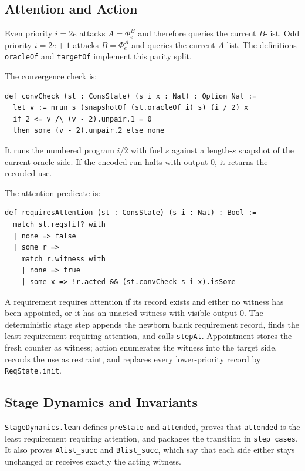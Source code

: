 \subsection{Attention and Action}

Even priority \(i=2e\) attacks \(A=\Phi_e^B\) and therefore queries the
current \(B\)-list.  Odd priority \(i=2e+1\) attacks \(B=\Phi_e^A\) and
queries the current \(A\)-list.  The definitions
\texttt{oracleOf} and \texttt{targetOf} implement this parity split.

The convergence check is:

\begin{lstlisting}
def convCheck (st : ConsState) (s i x : Nat) : Option Nat :=
  let v := nrun s (snapshotOf (st.oracleOf i) s) (i / 2) x
  if 2 <= v /\ (v - 2).unpair.1 = 0
  then some (v - 2).unpair.2 else none
\end{lstlisting}

It runs the numbered program \(i/2\) with fuel \(s\) against a length-\(s\)
snapshot of the current oracle side.  If the encoded run halts with output
\(0\), it returns the recorded use.

The attention predicate is:

\begin{lstlisting}
def requiresAttention (st : ConsState) (s i : Nat) : Bool :=
  match st.reqs[i]? with
  | none => false
  | some r =>
    match r.witness with
    | none => true
    | some x => !r.acted && (st.convCheck s i x).isSome
\end{lstlisting}

A requirement requires attention if its record exists and either no witness
has been appointed, or it has an unacted witness with visible output \(0\).
The deterministic stage step appends the newborn blank requirement record,
finds the least requirement requiring attention, and calls
\texttt{stepAt}.  Appointment stores the fresh counter as witness; action
enumerates the witness into the target side, records the use as restraint,
and replaces every lower-priority record by \texttt{ReqState.init}.

\subsection{Stage Dynamics and Invariants}

\texttt{StageDynamics.lean} defines \texttt{preState} and
\texttt{attended}, proves that \texttt{attended} is the least requirement
requiring attention, and packages the transition in \texttt{step_cases}.
It also proves \texttt{Alist_succ} and \texttt{Blist_succ}, which say that
each side either stays unchanged or receives exactly the acting witness.


